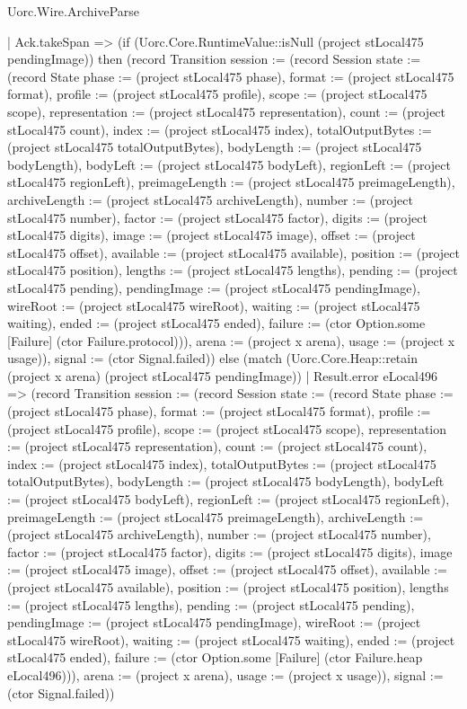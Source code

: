 \begin{lexlean}{Uorc.Wire.ArchiveParse}
\begin{semanticmodule}
{          | Ack.takeSpan => (if (Uorc.Core.RuntimeValue::isNull (project stLocal475 pendingImage)) then (record Transition {session := (record Session {state := (record State {phase := (project stLocal475 phase), format := (project stLocal475 format), profile := (project stLocal475 profile), scope := (project stLocal475 scope), representation := (project stLocal475 representation), count := (project stLocal475 count), index := (project stLocal475 index), totalOutputBytes := (project stLocal475 totalOutputBytes), bodyLength := (project stLocal475 bodyLength), bodyLeft := (project stLocal475 bodyLeft), regionLeft := (project stLocal475 regionLeft), preimageLength := (project stLocal475 preimageLength), archiveLength := (project stLocal475 archiveLength), number := (project stLocal475 number), factor := (project stLocal475 factor), digits := (project stLocal475 digits), image := (project stLocal475 image), offset := (project stLocal475 offset), available := (project stLocal475 available), position := (project stLocal475 position), lengths := (project stLocal475 lengths), pending := (project stLocal475 pending), pendingImage := (project stLocal475 pendingImage), wireRoot := (project stLocal475 wireRoot), waiting := (project stLocal475 waiting), ended := (project stLocal475 ended), failure := (ctor Option.some [Failure] (ctor Failure.protocol))}), arena := (project x arena), usage := (project x usage)}), signal := (ctor Signal.failed)}) else (match (Uorc.Core.Heap::retain (project x arena) (project stLocal475 pendingImage))
            | Result.error eLocal496 => (record Transition {session := (record Session {state := (record State {phase := (project stLocal475 phase), format := (project stLocal475 format), profile := (project stLocal475 profile), scope := (project stLocal475 scope), representation := (project stLocal475 representation), count := (project stLocal475 count), index := (project stLocal475 index), totalOutputBytes := (project stLocal475 totalOutputBytes), bodyLength := (project stLocal475 bodyLength), bodyLeft := (project stLocal475 bodyLeft), regionLeft := (project stLocal475 regionLeft), preimageLength := (project stLocal475 preimageLength), archiveLength := (project stLocal475 archiveLength), number := (project stLocal475 number), factor := (project stLocal475 factor), digits := (project stLocal475 digits), image := (project stLocal475 image), offset := (project stLocal475 offset), available := (project stLocal475 available), position := (project stLocal475 position), lengths := (project stLocal475 lengths), pending := (project stLocal475 pending), pendingImage := (project stLocal475 pendingImage), wireRoot := (project stLocal475 wireRoot), waiting := (project stLocal475 waiting), ended := (project stLocal475 ended), failure := (ctor Option.some [Failure] (ctor Failure.heap eLocal496))}), arena := (project x arena), usage := (project x usage)}), signal := (ctor Signal.failed)})
}
\end{semanticmodule}
\end{lexlean}
